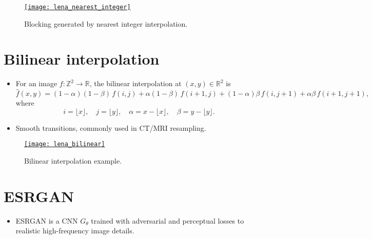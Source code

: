 \begin{figure}[H]
  \vspace{0ex}
  \centering
  \href{https://github.com/vicente-gonzalez-ruiz/medical_imaging/blob/main/notebooks/nearest_integer_interpolation.ipynb}{\texttt{[image: lena\_nearest\_integer]}}
  \caption{Blocking generated by nearest integer interpolation.}
  \label{fig:pixel_blocking}
\end{figure}

\section{Bilinear interpolation \cite{gonzalez2009digital}}

\begin{itemize}
\item For an image $f: \mathbb{Z}^2 \to \mathbb{R}$, the bilinear interpolation at 
$(x,y) \in \mathbb{R}^2$ is
\begin{equation}
\hat{f}(x,y) = (1-\alpha)(1-\beta)\, f(i,j) 
+ \alpha(1-\beta)\, f(i+1,j) 
+ (1-\alpha)\beta\, f(i,j+1) 
+ \alpha\beta\, f(i+1,j+1),
\end{equation}
where
\[
i = \lfloor x \rfloor, \quad j = \lfloor y \rfloor, \quad
\alpha = x - \lfloor x \rfloor, \quad \beta = y - \lfloor y \rfloor.
\]

\newpage
\item Smooth transitions, commonly used in \gls{CT}/\gls{MRI} resampling.
\end{itemize}

\begin{figure}[H]
  \vspace{-1ex}
  \centering
  \href{https://github.com/vicente-gonzalez-ruiz/medical_imaging/blob/main/notebooks/bilinear_interpolation.ipynb}{\texttt{[image: lena\_bilinear]}}
  \caption{Bilinear interpolation example.}
  \label{fig:bilinear_interpolation}
\end{figure}

\section{\gls{ESRGAN} \cite{wang2018esrgan}}
\begin{itemize}
\item ESRGAN is a  \gls{CNN}
  $G_\theta$ trained with adversarial and perceptual losses to
   realistic high-frequency image
  details.
\end{itemize}

